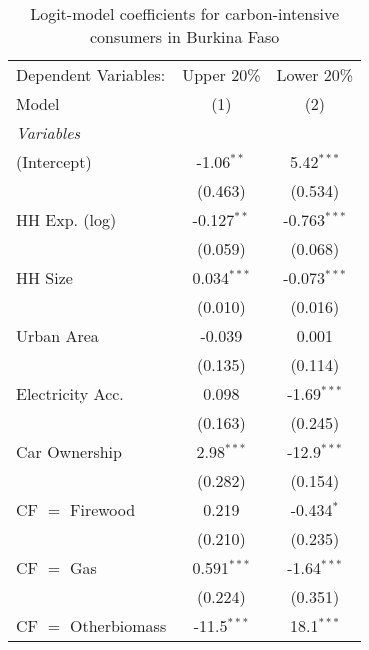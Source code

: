 
\begin{table}[htbp!]
   \centering
   \small
   \begin{adjustbox}{width = 1\textwidth, max height = 0.95\textheight, center}
      \begin{threeparttable}[b]
         \caption{\label{tab:Logit_1_BFA} Logit-model coefficients for carbon-intensive consumers in Burkina Faso}
         \begin{tabular}{lcc}
            \tabularnewline \midrule \midrule
            Dependent Variables: & Upper 20\%    & Lower 20\%\\   
            Model                & (1)           & (2)\\  
            \midrule
            \emph{Variables}\\
            (Intercept)          & -1.06$^{**}$  & 5.42$^{***}$\\   
                                 & (0.463)       & (0.534)\\   
            HH Exp. (log)        & -0.127$^{**}$ & -0.763$^{***}$\\   
                                 & (0.059)       & (0.068)\\   
            HH Size              & 0.034$^{***}$ & -0.073$^{***}$\\   
                                 & (0.010)       & (0.016)\\   
            Urban Area           & -0.039        & 0.001\\   
                                 & (0.135)       & (0.114)\\   
            Electricity Acc.     & 0.098         & -1.69$^{***}$\\   
                                 & (0.163)       & (0.245)\\   
            Car Ownership        & 2.98$^{***}$  & -12.9$^{***}$\\   
                                 & (0.282)       & (0.154)\\   
            CF $=$ Firewood      & 0.219         & -0.434$^{*}$\\   
                                 & (0.210)       & (0.235)\\   
            CF $=$ Gas           & 0.591$^{***}$ & -1.64$^{***}$\\   
                                 & (0.224)       & (0.351)\\   
            CF $=$ Otherbiomass  & -11.5$^{***}$ & 18.1$^{***}$\\   

\end{tabular}
\end{threeparttable}
\end{adjustbox}
\end{table}
